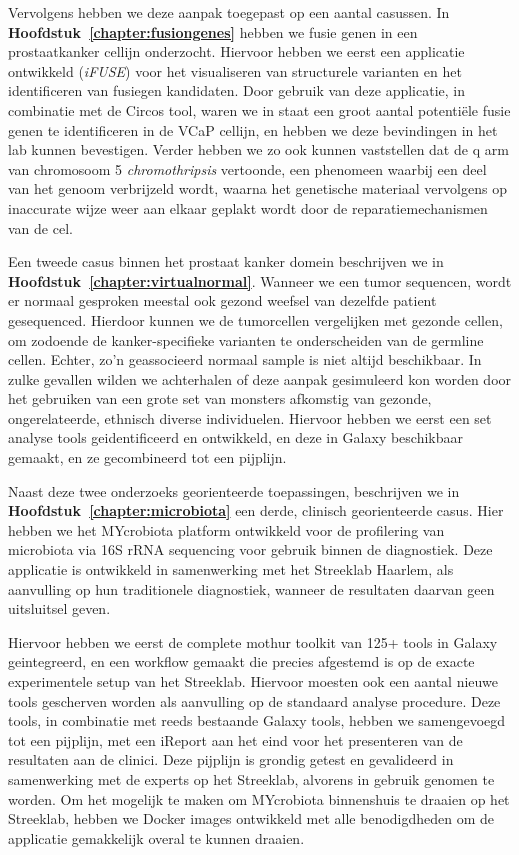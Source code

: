 Vervolgens hebben we deze aanpak toegepast op een aantal casussen. In \textbf{Hoofdstuk~\ref{chapter:fusiongenes}} hebben we fusie genen in een prostaatkanker cellijn onderzocht. Hiervoor hebben we eerst een applicatie ontwikkeld (\emph{iFUSE}) voor het visualiseren van structurele varianten en het identificeren van fusiegen kandidaten.
Door gebruik van deze applicatie, in combinatie met de Circos tool, waren we in staat een groot aantal potentiële fusie genen te identificeren in de VCaP cellijn, en hebben we deze bevindingen in het lab kunnen bevestigen.
Verder hebben we zo ook kunnen vaststellen dat de q arm van chromosoom 5 \emph{chromothripsis} vertoonde, een phenomeen waarbij een deel van het genoom verbrijzeld wordt, waarna het genetische materiaal vervolgens op inaccurate wijze weer aan elkaar geplakt wordt door de reparatiemechanismen van de cel.

Een tweede casus binnen het prostaat kanker domein beschrijven we in \textbf{Hoofdstuk~\ref{chapter:virtualnormal}}. Wanneer we een tumor sequencen, wordt er normaal gesproken meestal ook gezond weefsel van dezelfde patient gesequenced.
Hierdoor kunnen we de tumorcellen vergelijken met gezonde cellen, om zodoende de kanker-specifieke varianten te onderscheiden van de germline cellen.
Echter, zo'n geassocieerd normaal sample is niet altijd beschikbaar.
In zulke gevallen wilden we achterhalen of deze aanpak gesimuleerd kon worden door het gebruiken van een grote set van monsters afkomstig van gezonde, ongerelateerde, ethnisch diverse individuelen.
Hiervoor hebben we eerst een set analyse tools geidentificeerd en ontwikkeld, en deze in Galaxy beschikbaar gemaakt, en ze gecombineerd tot een pijplijn.

Naast deze twee onderzoeks georienteerde toepassingen, beschrijven we in \textbf{Hoofdstuk~\ref{chapter:microbiota}} een derde, clinisch georienteerde casus. Hier hebben we het MYcrobiota platform ontwikkeld voor de profilering van microbiota via 16S rRNA sequencing voor gebruik binnen de diagnostiek.
Deze applicatie is ontwikkeld in samenwerking met het Streeklab Haarlem, als aanvulling op hun traditionele diagnostiek, wanneer de resultaten daarvan geen uitsluitsel geven.

Hiervoor hebben we eerst de complete mothur toolkit van 125+ tools in Galaxy geintegreerd, en een workflow gemaakt die precies afgestemd is op de exacte experimentele setup van het Streeklab.
Hiervoor moesten ook een aantal nieuwe tools gescherven worden als aanvulling op de standaard analyse procedure.
Deze tools, in combinatie met reeds bestaande Galaxy tools, hebben we samengevoegd tot een pijplijn, met een iReport aan het eind voor het presenteren van de resultaten aan de clinici.
Deze pijplijn is grondig getest en gevalideerd in samenwerking met de experts op het Streeklab, alvorens in gebruik genomen te worden.
Om het mogelijk te maken om MYcrobiota binnenshuis te draaien op het Streeklab, hebben we Docker images ontwikkeld met alle benodigdheden om de applicatie gemakkelijk overal te kunnen draaien.


